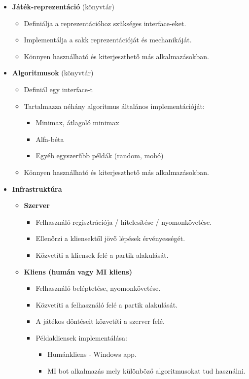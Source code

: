 \documentclass[twoside, a4paper, 12pt]{article}
\begin{document}
\begin{itemize}
	
	\item \textbf{Játék-reprezentáció} (könyvtár)
	\begin{itemize}
		\item Definiálja a reprezentációhoz szükséges interface-eket.
		\item Implementálja a sakk reprezentációját és mechanikáját.
		\item Könnyen használható és kiterjeszthető más alkalmazásokban.
	\end{itemize}

	\item \textbf{Algoritmusok} (könyvtár)
	\begin{itemize}
		\item Definiál egy interface-t
		\item Tartalmazza néhány algoritmus általános implementációját:
		\begin{itemize}
			\item Minimax, átlagoló minimax
			\item Alfa-béta
			\item Egyéb egyszerűbb példák (random, mohó)
		\end{itemize}
		\item Könnyen használható és kiterjeszthető más alkalmazásokban.
	\end{itemize}

	\item \textbf{Infrastruktúra}
	\begin{itemize}
		\item \textbf{Szerver}
		\begin{itemize}
			\item Felhasználó regisztrációja / hitelesítése / nyomonkövetése.
			\item Ellenőrzi a kliensektől jövő lépések érvényességét.
			\item Közvetíti a kliensek felé a partik alakulását.
		\end{itemize}
	
		\item \textbf{Kliens (humán vagy MI kliens)}
		\begin{itemize}
			\item Felhasználó beléptetése, nyomonkövetése.
			\item Közvetíti a felhasználó felé a partik alakulását.
			\item A játékos döntéseit közvetíti a szerver felé.
			\item Példakliensek implementálása:
			\begin{itemize}
				\item Humánkliens - Windows app.
				\item MI bot alkalmazás mely különböző algoritmusokat tud használni.
			\end{itemize}
		\end{itemize}
	\end{itemize}
\end{itemize}
\end{document}
